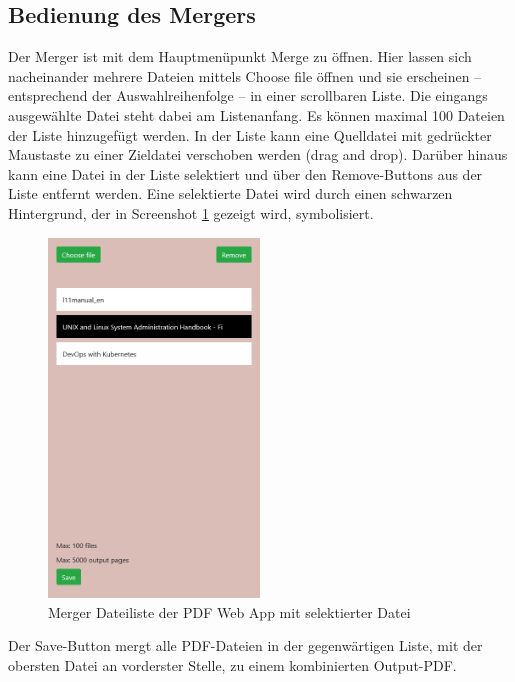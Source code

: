 \subsection{Bedienung des Mergers}
Der Merger ist mit dem Hauptmenüpunkt Merge zu öffnen. Hier lassen sich nacheinander mehrere Dateien mittels Choose file öffnen und sie erscheinen – entsprechend der Auswahlreihenfolge – in einer scrollbaren Liste. Die eingangs ausgewählte Datei steht dabei am Listenanfang. Es können maximal 100 Dateien der Liste hinzugefügt werden. In der Liste kann eine Quelldatei mit gedrückter Maustaste zu einer Zieldatei verschoben werden (drag and drop). Darüber hinaus  kann eine Datei in der Liste selektiert und über den Remove-Buttons aus der Liste entfernt werden. Eine selektierte Datei wird durch einen schwarzen Hintergrund, der in Screenshot \ref{fig:mergelist} gezeigt wird, symbolisiert.

\begin{figure}[!htbp]
	\centering
	\includegraphics[width=0.5\textwidth]{"images/mergelist.png"}
	\caption{Merger Dateiliste der PDF Web App mit selektierter Datei}
	\label{fig:mergelist}
\end{figure}

Der Save-Button mergt alle PDF-Dateien in der gegenwärtigen Liste, mit der obersten Datei an vorderster Stelle, zu einem kombinierten Output-PDF.

